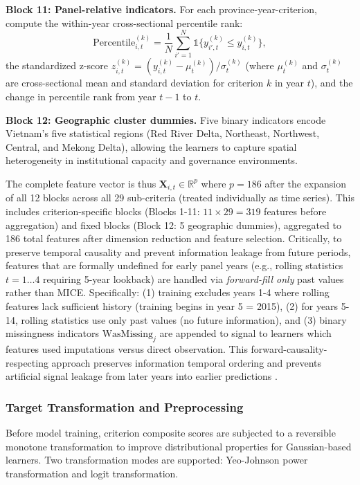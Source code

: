 \documentclass[12pt,a4paper]{article}
\begin{document}
\textbf{Block 11: Panel-relative indicators.} For each province-year-criterion, compute the within-year cross-sectional percentile rank:
\begin{equation}
\text{Percentile}_{i,t}^{(k)} = \frac{1}{N} \sum_{i'=1}^{N} \mathbb{1}\{ y_{i',t}^{(k)} \le y_{i,t}^{(k)} \},
\end{equation}
the standardized z-score $z_{i,t}^{(k)} = (y_{i,t}^{(k)} - \mu_{t}^{(k)}) / \sigma_{t}^{(k)}$ (where $\mu_{t}^{(k)}$ and $\sigma_{t}^{(k)}$ are cross-sectional mean and standard deviation for criterion $k$ in year $t$), and the change in percentile rank from year $t-1$ to $t$.

\textbf{Block 12: Geographic cluster dummies.} Five binary indicators encode Vietnam's five statistical regions (Red River Delta, Northeast, Northwest, Central, and Mekong Delta), allowing the learners to capture spatial heterogeneity in institutional capacity and governance environments.

The complete feature vector is thus $\mathbf{X}_{i,t} \in \mathbb{R}^p$ where $p = 186$ after the expansion of all 12 blocks across all 29 sub-criteria (treated individually as time series). This includes criterion-specific blocks (Blocks 1-11: $11 \times 29 = 319$ features before aggregation) and fixed blocks (Block 12: 5 geographic dummies), aggregated to 186 total features after dimension reduction and feature selection. Critically, to preserve temporal causality and prevent information leakage from future periods, features that are formally undefined for early panel years (e.g., rolling statistics $t=1 \ldots 4$ requiring 5-year lookback) are handled via \emph{forward-fill only} past values rather than MICE. Specifically: (1) training excludes years 1-4 where rolling features lack sufficient history (training begins in year 5 = 2015), (2) for years 5-14, rolling statistics use only past values (no future information), and (3) binary missingness indicators $\text{WasMissing}_j$ are appended to signal to learners which features used imputations versus direct observation. This forward-causality-respecting approach preserves information temporal ordering and prevents artificial signal leakage from later years into earlier predictions \citep{Rubin1987, vanBuuren2018}.

\subsubsection{Target Transformation and Preprocessing}

Before model training, criterion composite scores are subjected to a reversible monotone transformation to improve distributional properties for Gaussian-based learners. Two transformation modes are supported: Yeo-Johnson power transformation and logit transformation.
\end{document}
